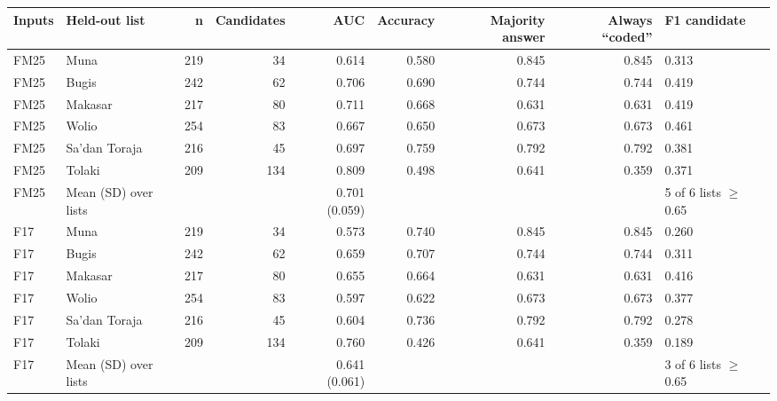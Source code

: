 \begin{tabular}{llrrrrrrl}
\toprule
Inputs & Held-out list & n & Candidates & AUC & Accuracy & Majority answer & Always ``coded'' & F1 candidate \\
\midrule
FM25 & Muna & 219 & 34 & 0.614 & 0.580 & 0.845 & 0.845 & 0.313 \\
FM25 & Bugis & 242 & 62 & 0.706 & 0.690 & 0.744 & 0.744 & 0.419 \\
FM25 & Makasar & 217 & 80 & 0.711 & 0.668 & 0.631 & 0.631 & 0.419 \\
FM25 & Wolio & 254 & 83 & 0.667 & 0.650 & 0.673 & 0.673 & 0.461 \\
FM25 & Sa'dan Toraja & 216 & 45 & 0.697 & 0.759 & 0.792 & 0.792 & 0.381 \\
FM25 & Tolaki & 209 & 134 & 0.809 & 0.498 & 0.641 & 0.359 & 0.371 \\
FM25 & Mean (SD) over lists &  &  & 0.701 (0.059) &  &  &  & 5 of 6 lists $\geq$ 0.65 \\
\midrule
F17 & Muna & 219 & 34 & 0.573 & 0.740 & 0.845 & 0.845 & 0.260 \\
F17 & Bugis & 242 & 62 & 0.659 & 0.707 & 0.744 & 0.744 & 0.311 \\
F17 & Makasar & 217 & 80 & 0.655 & 0.664 & 0.631 & 0.631 & 0.416 \\
F17 & Wolio & 254 & 83 & 0.597 & 0.622 & 0.673 & 0.673 & 0.377 \\
F17 & Sa'dan Toraja & 216 & 45 & 0.604 & 0.736 & 0.792 & 0.792 & 0.278 \\
F17 & Tolaki & 209 & 134 & 0.760 & 0.426 & 0.641 & 0.359 & 0.189 \\
F17 & Mean (SD) over lists &  &  & 0.641 (0.061) &  &  &  & 3 of 6 lists $\geq$ 0.65 \\
\bottomrule
\end{tabular}
